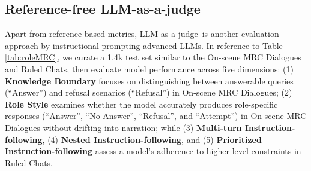 \subsection{Reference-free LLM-as-a-judge}
Apart from reference-based metrics, LLM-as-a-judge\,\cite{zheng2024judging} is another evaluation approach by instructional prompting advanced LLMs. In reference to Table\,\ref{tab:roleMRC}, we curate a 1.4k test set similar to the On-scene MRC Dialogues and Ruled Chats, then evaluate model performance across five dimensions: (1) \textbf{Knowledge Boundary} focuses on distinguishing between answerable queries (``Answer'') and refusal scenarios (``Refusal'') in On-scene MRC Dialogues; (2) \textbf{Role Style} examines whether the model accurately produces role-specific responses (``Answer'', ``No Answer'', ``Refusal'', and ``Attempt'') in On-scene MRC Dialogues without drifting into narration; while (3) \textbf{Multi-turn Instruction-following}, (4) \textbf{Nested Instruction-following}, and (5) \textbf{Prioritized Instruction-following} assess a model's adherence to higher-level constraints in Ruled Chats.

